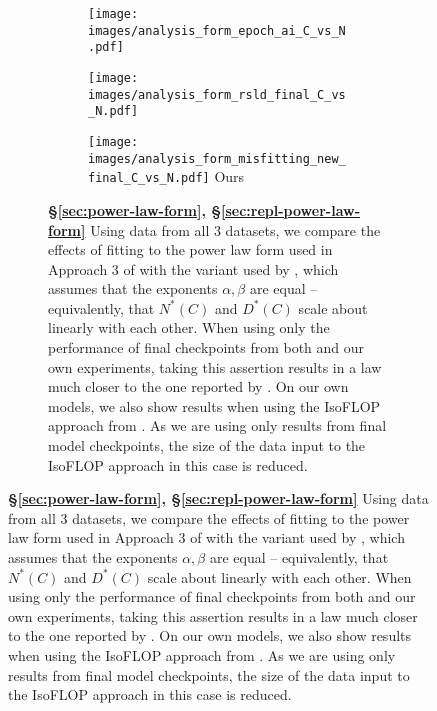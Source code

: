\begin{figure}[]
\centering

\begin{subfigure}{\textwidth}
\begin{subfigure}{0.49\textwidth}
    \centering
    \texttt{[image: images/analysis\_form\_epoch\_ai\_C\_vs\_N.pdf]}
    \footnotesize{\citet{hoffmann2022training,besiroglu2024chinchilla}}
    \label{fig:analysis_form_epoch}
\end{subfigure}
\hfill
\begin{subfigure}{0.49\textwidth}
    \centering
    \texttt{[image: images/analysis\_form\_rsld\_final\_C\_vs\_N.pdf]}
    \footnotesize{\citet{porian2024resolving}}
\end{subfigure}
\vspace{1em}
\centering

\begin{subfigure}{0.49\textwidth}
    \centering
    \texttt{[image: images/analysis\_form\_misfitting\_new\_final\_C\_vs\_N.pdf]}
    \footnotesize{Ours}
    \label{fig:analysis_form_ours}
\end{subfigure}
\vspace{1em}


\caption{\textbf{\S\ref{sec:power-law-form}, \S\ref{sec:repl-power-law-form}} Using data from all 3 datasets, we compare the effects of fitting to the power law form used in Approach 3 of \citet{hoffmann2022training} with the variant used by \citet{muennighoff2024scaling}, which assumes that the exponents $\alpha, \beta$ are equal -- equivalently, that $N^*(C)$ and $D^*(C)$ scale about linearly with each other.  When using only the performance of final checkpoints from both \citet{besiroglu2024chinchilla} and our own experiments, taking this assertion results in a law much closer to the one reported by \citet{hoffmann2022training}. On our own models, we also show results when using the IsoFLOP approach from \citet{hoffmann2022training}. As we are using only results from final model checkpoints, the size of the data input to the IsoFLOP approach in this case is reduced.}
\label{fig:analysis_form}
\end{subfigure}


\end{figure}
